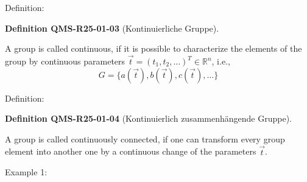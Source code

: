 \documentclass[10pt, letterpaper]{article}
\newcommand{\CustomHeading}[3]{%
  \par\medskip\noindent%
  \textbf{#1 #2} \textnormal{(#3)}.\enskip%
}
\newenvironment{DEF}[2]{\begin{unitbox}\CustomHeading{Definition}{#1}{#2}}{\end{unitbox}}
\begin{document}
Definition: 


\begin{DEF}{QMS-R25-01-03}{Kontinuierliche Gruppe}
A group is called continuous, if it is possible to characterize the elements of the group by continuous parameters $\vec{t}=\left(t_{1}, t_{2}, \ldots\right)^{T} \in \mathbb{R}^{n}$, i.e.,
$$
G=\{a(\vec{t}), b(\vec{t}), c(\vec{t}), \ldots\}
$$
\end{DEF}

Definition: 

\begin{DEF}{QMS-R25-01-04}{Kontinuierlich zusammenhängende Gruppe}
A group is called continuously connected, if one can transform every group element into another one by a continuous change of the parameters $\vec{t}$.
\end{DEF}


Example 1: 
\end{document}
